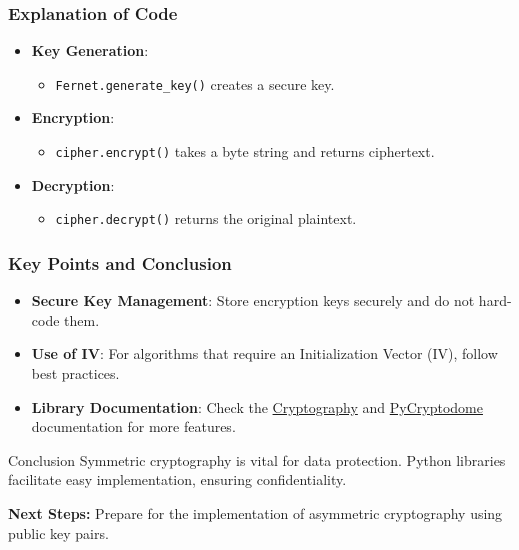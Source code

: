 \documentclass{beamer}
\begin{document}
\begin{frame}[fragile]
    \frametitle{Explanation of Code}
    \begin{itemize}
        \item \textbf{Key Generation}: 
            \begin{itemize}
                \item \texttt{Fernet.generate\_key()} creates a secure key.
            \end{itemize}
        \item \textbf{Encryption}: 
            \begin{itemize}
                \item \texttt{cipher.encrypt()} takes a byte string and returns ciphertext.
            \end{itemize}
        \item \textbf{Decryption}: 
            \begin{itemize}
                \item \texttt{cipher.decrypt()} returns the original plaintext.
            \end{itemize}
    \end{itemize}
\end{frame}

\begin{frame}[fragile]
    \frametitle{Key Points and Conclusion}
    \begin{itemize}
        \item \textbf{Secure Key Management}: Store encryption keys securely and do not hard-code them.
        \item \textbf{Use of IV}: For algorithms that require an Initialization Vector (IV), follow best practices.
        \item \textbf{Library Documentation}: Check the 
        \href{https://cryptography.io/en/latest/}{Cryptography} and 
        \href{https://www.pycryptodome.org/src/introduction}{PyCryptodome} documentation for more features.
    \end{itemize}

    \begin{block}{Conclusion}
        Symmetric cryptography is vital for data protection. Python libraries facilitate easy implementation, ensuring confidentiality.
    \end{block}

    \textbf{Next Steps:} Prepare for the implementation of asymmetric cryptography using public key pairs.
\end{frame}
\end{document}

